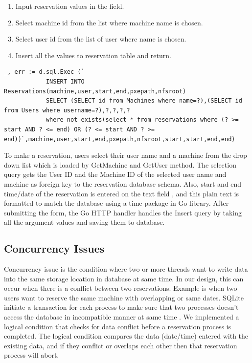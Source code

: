 \begin{lstlisting}[caption=Pseudocode, label=addreservation]
\end{lstlisting}
	\begin{enumerate}
	\item Input reservation values in the field.
	\item Select machine id from the list where machine name is chosen.
	\item Select user id from the list of user where name is chosen.
	\item Insert all the values to reservation table and return.
	\end{enumerate}


\begin{lstlisting}[caption=Storing Reservation details, label=Adding reservation]
	 _, err := d.sql.Exec (`
	      	INSERT INTO Reservations(machine,user,start,end,pxepath,nfsroot)
			SELECT (SELECT id from Machines where name=?),(SELECT id from Users where username=?),?,?,?,?
			where not exists(select * from reservations where (? >= start AND ? <= end) OR (? <= start AND ? >= end))`,machine,user,start,end,pxepath,nfsroot,start,start,end,end)
\end{lstlisting}

To make a reservation, users select their user name and a machine from the drop down list which is loaded by GetMachine and GetUser method. The selection query gets the User ID and the Machine ID of the selected user name and machine as foreign key to the reservation database schema. Also, start and end time/date of the reservation is entered on the text field , and this plain text is formatted to match the database using a time package in Go library. After submitting the form, the Go HTTP handler handles the Insert query by taking all the argument values and saving them to database. 
\subsection*{Concurrency Issues}
Concurrency issue is the condition where two or more threads want to write data into the same storage location in database at same time. In our design, this can occur when there is a conflict between two reservations. Example is when two users want to reserve the same machine with overlapping or same dates. SQLite initiate a transaction for each process to make sure that two processes doesn't access the database in incompatible manner at same time . We implemented a logical condition that checks for data conflict before a reservation process is completed. The logical condition compares the data (date/time) entered with the existing data, and if they conflict or overlaps each other then that reservation process will abort.
